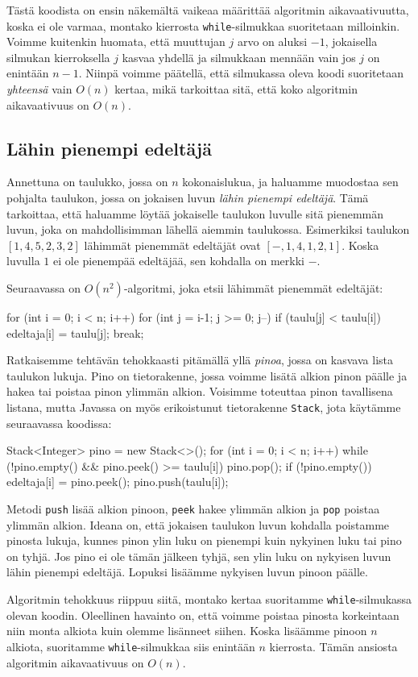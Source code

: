 Tästä koodista on ensin näkemältä vaikeaa määrittää algoritmin
aikavaativuutta, koska ei ole varmaa, montako kierrosta
\texttt{while}-silmukkaa suoritetaan milloinkin.
Voimme kuitenkin huomata, että muuttujan $j$ arvo on aluksi $-1$,
jokaisella silmukan kierroksella $j$ kasvaa yhdellä
ja silmukkaan mennään vain jos $j$ on enintään $n-1$.
Niinpä voimme päätellä, että silmukassa oleva koodi suoritetaan \emph{yhteensä}
vain $O(n)$ kertaa, mikä tarkoittaa sitä,
että koko algoritmin aikavaativuus on $O(n)$.

\subsection{Lähin pienempi edeltäjä}

Annettuna on taulukko, jossa on $n$ kokonaislukua,
ja haluamme muodostaa sen pohjalta taulukon,
jossa on jokaisen luvun \emph{lähin pienempi edeltäjä}.
Tämä tarkoittaa, että haluamme löytää jokaiselle taulukon luvulle
sitä pienemmän luvun, joka on mahdollisimman lähellä aiemmin taulukossa.
Esimerkiksi taulukon $[1,4,5,2,3,2]$
lähimmät pienemmät edeltäjät ovat $[-,1,4,1,2,1]$.
Koska luvulla $1$ ei ole pienempää edeltäjää,
sen kohdalla on merkki $-$.

Seuraavassa on $O(n^2)$-algoritmi, joka etsii
lähimmät pienemmät edeltäjät:

\begin{code}
for (int i = 0; i < n; i++) {
    for (int j = i-1; j >= 0; j--) {
        if (taulu[j] < taulu[i]) {
            edeltaja[i] = taulu[j];
            break;
        }
    }
}
\end{code}

Ratkaisemme tehtävän tehokkaasti pitämällä yllä \emph{pinoa},
jossa on kasvava lista taulukon lukuja.
Pino on tietorakenne, jossa voimme lisätä alkion pinon päälle
ja hakea tai poistaa pinon ylimmän alkion.
Voisimme toteuttaa pinon tavallisena listana,
mutta Javassa on myös erikoistunut tietorakenne \texttt{Stack},
jota käytämme seuraavassa koodissa:

\begin{code}
Stack<Integer> pino = new Stack<>();
for (int i = 0; i < n; i++) {
    while (!pino.empty() && pino.peek() >= taulu[i]) {
        pino.pop();
    }
    if (!pino.empty()) {
        edeltaja[i] = pino.peek();
    }
    pino.push(taulu[i]);
}
\end{code}

Metodi \texttt{push} lisää alkion pinoon,
\texttt{peek} hakee ylimmän alkion ja \texttt{pop}
poistaa ylimmän alkion.
Ideana on, että jokaisen taulukon luvun kohdalla poistamme
pinosta lukuja, kunnes pinon ylin luku on pienempi kuin nykyinen luku
tai pino on tyhjä.
Jos pino ei ole tämän jälkeen tyhjä, sen ylin luku on nykyisen luvun
lähin pienempi edeltäjä.
Lopuksi lisäämme nykyisen luvun pinoon päälle.

Algoritmin tehokkuus riippuu siitä, montako kertaa suoritamme
\texttt{while}-silmukassa olevan koodin.
Oleellinen havainto on, että voimme poistaa pinosta
korkeintaan niin monta alkiota kuin olemme lisänneet siihen.
Koska lisäämme pinoon $n$ alkiota, suoritamme \texttt{while}-silmukkaa
siis enintään $n$ kierrosta.
Tämän ansiosta algoritmin aikavaativuus on $O(n)$.